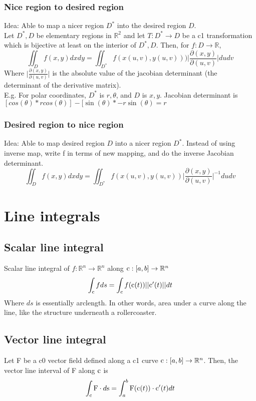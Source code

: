 \subsubsection*{Nice region to desired region}
Idea: Able to map a nicer region $D^*$ into the desired region $D$.\\
Let $D^*, D$ be elementary regions in $\mathbb{R}^2$ and let $T:D^*\to D$ be a c1 transformation which is bijective at least on the interior of $D^*, D$. Then, for $f:D\to \mathbb{R}$,
$$\iint_{D}f(x,y)dxdy=\iint_{D^*}f(x(u,v), y(u,v))) \Big\vert\frac{\partial(x,y)}{\partial(u,v)}\Big\vert du dv$$
Where $\Big\vert\frac{\partial(x,y)}{\partial(u,v)}\Big\vert$ is the absolute value of the jacobian determinant (the determinant of the derivative matrix).\\
E.g. For polar coordinates, $D^*$ is $r,\theta$, and $D$ is $x,y$. Jacobian determinant is $[cos(\theta)*rcos(\theta)] - [\sin(\theta) * -r\sin(\theta)=r$

\subsubsection*{Desired region to nice region}
Idea: Able to map desired region $D$ into a nicer region $D^*$. Instead of using inverse map, write f in terms of new mapping, and do the inverse Jacobian determinant.
$$\iint_{D}f(x,y)dxdy=\iint_{D^*}f(x(u,v), y(u,v)) \Big\vert\frac{\partial(x,y)}{\partial(u,v)}\Big\vert^{-1} du dv$$

\section*{Line integrals}
\subsection*{Scalar line integral}
Scalar line integral of $f:\mathbb{R}^n\to\mathbb{R}^n$ along $\textrm{c}:[a,b]\to \mathbb{R}^n$
$$\int_{\textrm{c}}f ds = \int_{\textrm{c}} f(\textrm{c}(t))||\textrm{c}'(t)||dt$$
Where $ds$ is essentially arclength. In other words, area under a curve along the line, like the structure underneath a rollercoaster.

\subsection*{Vector line integral}
Let F be a c0 vector field defined along a c1 curve $\textrm{c}:[a,b]\to \mathbb{R}^n$. Then, the vector line interval of F along $\textrm{c}$ is
$$\int_{\textrm{c}}\textrm{F}\cdot d\textrm{s}=\int_{a}^{b}\textrm{F}(\textrm{c}(t))\cdot \textrm{c}'(t) dt$$

